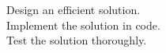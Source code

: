 \documentclass[preview]{standalone}
\begin{document}
Design an efficient solution.\\Implement the solution in code.\\Test the solution thoroughly.\\
\end{document}
